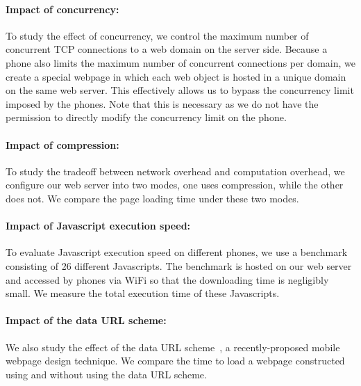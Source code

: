 \paragraph{Impact of concurrency:} To study the effect of 
concurrency, we control the maximum number of concurrent TCP 
connections to a web domain on the server side. %
Because a phone also limits the maximum number of concurrent 
connections per domain, we create a special webpage in which 
each web object is hosted in a unique domain on the same web 
server. This effectively allows us to bypass the concurrency 
limit imposed by the phones. Note that this is necessary as we 
do not have the permission to directly modify the concurrency 
limit on the phone.






\paragraph{Impact of compression:} To study the tradeoff between 
network overhead and computation overhead, we configure our web
server into two modes, one uses compression, while the other does 
not. We compare the page loading time under these two modes.

\paragraph{Impact of Javascript execution speed:} To evaluate 
Javascript execution speed on different phones, we use a 
benchmark~\cite{sunspider} consisting of 26 different Javascripts. 
The benchmark is hosted on our web server and accessed by phones 
via WiFi so that the downloading time is negligibly small. We 
measure the total execution time of these Javascripts. 

\paragraph{Impact of the data URL scheme:} We also study the effect 
of the data URL scheme~\cite{rfc2397}, a recently-proposed mobile 
webpage design technique. We compare the time to load a webpage 
constructed using and without using the data URL scheme. 
\newline
\newline
\newline

